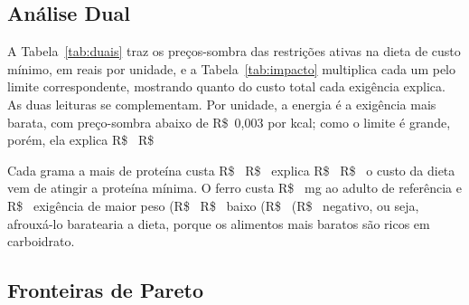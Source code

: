 \documentclass[12pt]{article}
\begin{document}
\subsection{Análise Dual}

A Tabela~\ref{tab:duais} traz os preços-sombra das restrições ativas na dieta de custo
mínimo, em reais por unidade, e a Tabela~\ref{tab:impacto} multiplica cada um pelo
limite correspondente, mostrando quanto do custo total cada exigência explica. As duas
leituras se complementam. Por unidade, a energia é a exigência mais barata, com
preço-sombra abaixo de R\$~0,003 por kcal; como o limite é grande, porém, ela explica
R\$~%
R\$~%

Cada grama a mais de proteína custa R\$~%
R\$~%
explica R\$~%
R\$~%
o custo da dieta vem de atingir a proteína mínima. O ferro custa R\$~%
mg ao adulto de referência e R\$~%
exigência de maior peso (R\$~%
R\$~%
baixo (R\$~%
(R\$~%
negativo, ou seja, afrouxá-lo baratearia a dieta, porque os alimentos mais baratos são
ricos em carboidrato.

\begin{table}[ht]
\centering
\caption{Preços-sombra na dieta de custo mínimo (R\$ por unidade; ``--'' indica
restrição não ativa).}\label{tab:duais}
\footnotesize

\end{table}

\begin{table}[ht]
\centering
\caption{Impacto de cada exigência no custo mínimo diário (preço-sombra $\times$
limite, em R\$). A linha dos limites de porção completa a soma pela dualidade forte.}\label{tab:impacto}
\footnotesize

\end{table}

\subsection{Fronteiras de Pareto}
\end{document}
